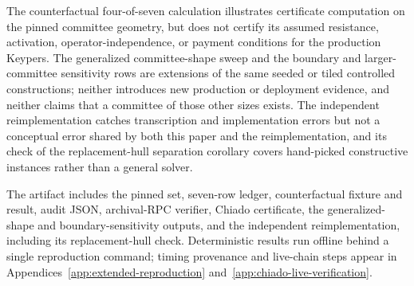 The counterfactual four-of-seven calculation illustrates certificate
computation on the pinned committee geometry, but does not certify its
assumed resistance, activation, operator-independence, or payment conditions
for the production Keypers. The generalized committee-shape sweep and the
boundary and larger-committee sensitivity rows are extensions of the same
seeded or tiled controlled constructions; neither introduces new production or
deployment evidence, and neither claims that a committee of those other sizes
exists. The independent reimplementation catches transcription and
implementation errors but not a conceptual error shared by both this paper
and the reimplementation, and its check of the replacement-hull separation
corollary covers hand-picked constructive instances rather than a general
solver.

The artifact includes the pinned set, seven-row ledger, counterfactual fixture
and result, audit JSON, archival-RPC verifier, Chiado certificate, the
generalized-shape and boundary-sensitivity outputs, and the independent
reimplementation, including its replacement-hull check. Deterministic results
run offline behind a single reproduction command; timing provenance and
live-chain steps appear in Appendices~\ref{app:extended-reproduction}
and~\ref{app:chiado-live-verification}.
